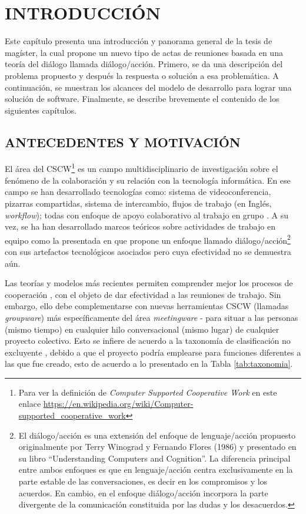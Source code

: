 \section{INTRODUCCIÓN}

Este capítulo presenta una introducción y panorama general de la tesis de magíster, la cual propone un nuevo tipo de actas de reuniones basada en una teoría del diálogo llamada diálogo/acción. Primero, se da una descripción del problema propuesto y después la respuesta o solución a esa problemática. A continuación, se muestran los alcances del modelo de desarrollo para lograr una solución de software. Finalmente, se describe brevemente el contenido de los siguientes capítulos.


\subsection{ANTECEDENTES Y MOTIVACIÓN}
El área del CSCW\footnote{Para ver la definición de \textit{Computer Supported Cooperative Work} en este enlace \url{https://en.wikipedia.org/wiki/Computer-supported_cooperative_work}} es un campo multidisciplinario de investigación sobre el fenómeno de la colaboración y su relación con la tecnología informática. En ese campo se han desarrollado tecnologías como: sistema de videoconferencia, pizarras compartidas, sistema de intercambio, flujos de trabajo (en Inglés, \textit{workflow}); todas con enfoque de apoyo colaborativo al trabajo en grupo . A su vez, se ha han desarrollado marcos teóricos sobre actividades de trabajo en equipo como la presentada en  que propone un enfoque llamado diálogo/acción\footnote{El diálogo/acción es una extensión del enfoque de lenguaje/acción propuesto originalmente por Terry Winograd y Fernando Flores (1986) y presentado en su libro “Understanding Computers and Cognition”. La diferencia principal entre ambos enfoques es que en lenguaje/acción centra exclusivamente en la parte estable de las conversaciones, es decir en los compromisos y los acuerdos. En cambio, en el enfoque diálogo/acción incorpora la parte divergente de la comunicación constituida por las dudas y los desacuerdos.} con sus artefactos tecnológicos asociados pero cuya efectividad no se demuestra aún.

Las teorías y modelos más recientes permiten comprender mejor los procesos de cooperación , con el objeto de dar efectividad a las reuniones de trabajo. Sin embargo, ello debe complementarse con nuevas herramientas CSCW (llamadas \textit{groupware}) más específicamente del área \textit{meetingware} - para situar a las personas (mismo tiempo) en cualquier hilo conversacional (mismo lugar) de cualquier proyecto colectivo. Esto se infiere de acuerdo a la taxonomía de clasificación no excluyente , debido a que el proyecto podría emplearse para funciones diferentes a las que fue creado, esto de acuerdo a lo presentado en la Tabla \ref{tab:taxonomia}.


